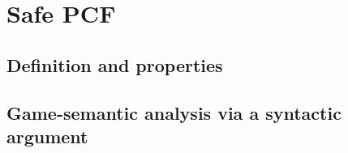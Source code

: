     


    
    


    \section{Safe PCF}
        \subsection{Definition and properties}
        \subsection{Game-semantic analysis via a syntactic argument}

    


